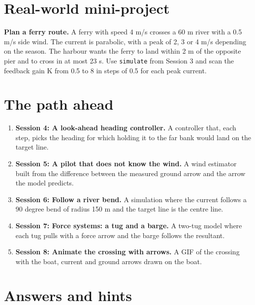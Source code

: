 \documentclass[11pt,a4paper]{article}
\begin{document}
\section{Real-world mini-project}
\textbf{Plan a ferry route.} A ferry with speed 4 m/s crosses a 60 m river with a 0.5 m/s side wind. The current is parabolic, with a peak of 2, 3 or 4 m/s depending on the season. The harbour wants the ferry to land within 2 m of the opposite pier and to cross in at most 23 s. Use \texttt{simulate} from Session 3 and scan the feedback gain K from 0.5 to 8 in steps of 0.5 for each peak current.

\section{The path ahead}
\begin{enumerate}[nosep]
\item \textbf{Session 4: A look-ahead heading controller.} A controller that, each step, picks the heading for which holding it to the far bank would land on the target line.
\item \textbf{Session 5: A pilot that does not know the wind.} A wind estimator built from the difference between the measured ground arrow and the arrow the model predicts.
\item \textbf{Session 6: Follow a river bend.} A simulation where the current follows a 90 degree bend of radius 150 m and the target line is the centre line.
\item \textbf{Session 7: Force systems: a tug and a barge.} A two-tug model where each tug pulls with a force arrow and the barge follows the resultant.
\item \textbf{Session 8: Animate the crossing with arrows.} A GIF of the crossing with the boat, current and ground arrows drawn on the boat.
\end{enumerate}

\section{Answers and hints}
\end{document}
